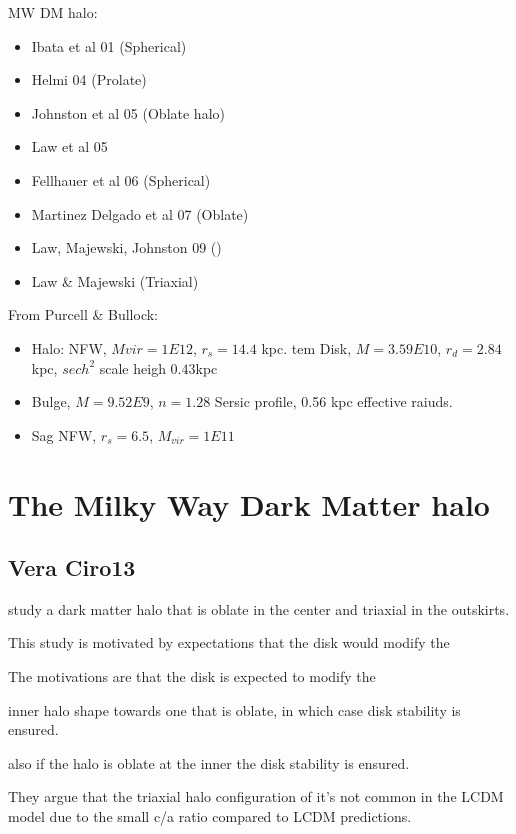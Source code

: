 \documentclass[12pt]{article}
\begin{document}
MW DM halo:

\begin{itemize}
\item Ibata et al 01 (Spherical)
\item Helmi 04 (Prolate)
\item Johnston et al 05 (Oblate halo)
\item Law et al 05
\item Fellhauer et al 06 (Spherical)
\item Martinez Delgado et al 07 (Oblate)
\item Law, Majewski, Johnston 09 ()
\item Law \& Majewski (Triaxial)

\end{itemize}

From Purcell \& Bullock:

\begin{itemize}
\item Halo: NFW, $Mvir=1E12$, $r_s=14.4$ kpc.
tem Disk, $M=3.59E10$, $r_d = 2.84$kpc, $sech^2$ scale heigh $0.43$kpc
\item Bulge, $M=9.52E9$, $n=1.28$ Sersic profile, 0.56 kpc effective raiuds.
\item Sag NFW, $r_s = 6.5$, $M_{vir}=1E11$

\end{itemize}

\section{The Milky Way Dark Matter halo}\label{mw}
\subsection{Vera Ciro13}

\citep{Vera13} study a dark matter halo that is oblate in the center
 and triaxial in the outskirts. 

This study is motivated by expectations that the disk would modify the 

The motivations are that the disk is expected
 to modify the

 inner halo shape towards one that is oblate, in which case disk stability 
is ensured.  

also if the
halo is oblate at the inner the disk stability is ensured. 

They
argue that the triaxial halo configuration of \citep{Law10} it's
not common in the LCDM model due to the small c/a ratio compared to
LCDM predictions.
\end{document}
